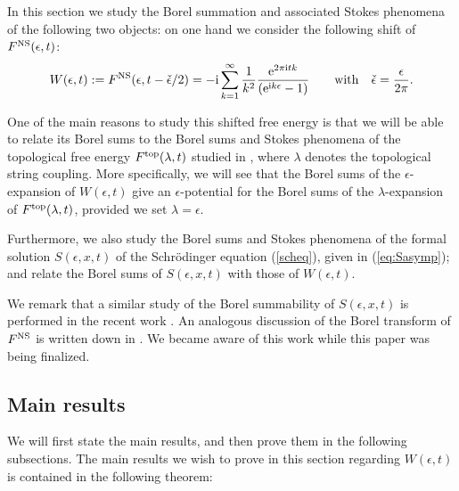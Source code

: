 \documentclass[pdftex]{sigma}
\numberwithin{equation}{section}
\begin{document}
In this section we study the Borel summation and associated Stokes phenomena of the following two objects: on one hand we consider the following shift of $F^{\rm NS}(\epsilon,t)$:
\begin{equation*}%
 W(\epsilon,t):=F^{\rm NS}(\epsilon,t-\check{\epsilon}/2)=-\mathrm{i} \sum_{k=1}^{\infty} \frac{1}{k^2} \frac{{\rm e}^{2\pi \mathrm{i} t k}}{({\rm e}^{\mathrm{i} k \epsilon}-1)} \qquad \mathrm{with} \quad \check{\epsilon}=\frac{\epsilon}{2\pi}.
\end{equation*}

One of the main reasons to study this shifted free energy is that we will be able to relate its Borel sums to the Borel sums and Stokes phenomena of the topological free energy $F^{{\rm top}}(\lambda,t)$ studied in \cite{ASTT21}, where $\lambda$ denotes the topological string coupling. More specifically, we will see that the Borel sums of the $\epsilon$-expansion of $W(\epsilon,t)$ give an $\epsilon$-potential for the Borel sums of the $\lambda$-expansion of $F^{{\rm top}}(\lambda,t)$, provided we set $\lambda=\epsilon$.

Furthermore, we also study the Borel sums and Stokes phenomena of the formal solution $S(\epsilon,x,t)$ of the Schr\"odinger equation (\ref{scheq}), given in (\ref{eq:Sasymp}); and relate the Borel sums of $S(\epsilon,x,t)$ with those of $W(\epsilon,t)$.

\begin{Remark}
We remark that a similar study of the Borel summability of $S(\epsilon,x,t)$ is performed in the recent work \cite[Section 4]{GHN}. An analogous discussion of the Borel transform of $F^{\rm NS}$ is written down in \cite[Section 4.5.1]{GHN}. We became aware of this work while this paper was being finalized.
\end{Remark}



\subsection{Main results}

We will first state the main results, and then prove them in the following subsections. The main results we wish to prove in this section regarding $W(\epsilon,t)$ is contained in the following theorem:
\end{document}
